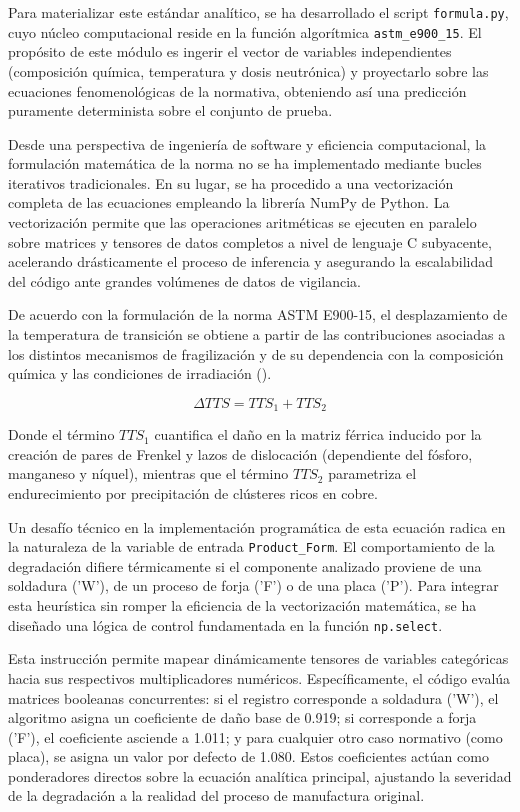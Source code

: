 \documentclass[a4paper, 12pt, twocolumn]{book}
\begin{document}
Para materializar este estándar analítico, se ha desarrollado el script \texttt{formula.py}, cuyo núcleo computacional reside en la función algorítmica \texttt{astm\_e900\_15}. El propósito de este módulo es ingerir el vector de variables independientes (composición química, temperatura y dosis neutrónica) y proyectarlo sobre las ecuaciones fenomenológicas de la normativa, obteniendo así una predicción puramente determinista sobre el conjunto de prueba. 

Desde una perspectiva de ingeniería de software y eficiencia computacional, la formulación matemática de la norma no se ha implementado mediante bucles iterativos tradicionales. En su lugar, se ha procedido a una vectorización completa de las ecuaciones empleando la librería NumPy de Python. La vectorización permite que las operaciones aritméticas se ejecuten en paralelo sobre matrices y tensores de datos completos a nivel de lenguaje C subyacente, acelerando drásticamente el proceso de inferencia y asegurando la escalabilidad del código ante grandes volúmenes de datos de vigilancia.

De acuerdo con la formulación de la norma ASTM E900-15, el desplazamiento de la temperatura de transición se obtiene a partir de las contribuciones asociadas a los distintos mecanismos de fragilización y de su dependencia con la composición química y las condiciones de irradiación (\cite{astmE90015}).

\begin{equation}
    \Delta TTS = TTS_1 + TTS_2
\end{equation}

Donde el término $TTS_1$ cuantifica el daño en la matriz férrica inducido por la creación de pares de Frenkel y lazos de dislocación (dependiente del fósforo, manganeso y níquel), mientras que el término $TTS_2$ parametriza el endurecimiento por precipitación de clústeres ricos en cobre.

Un desafío técnico en la implementación programática de esta ecuación radica en la naturaleza de la variable de entrada \texttt{Product\_Form}. El comportamiento de la degradación difiere térmicamente si el componente analizado proviene de una soldadura ('W'), de un proceso de forja ('F') o de una placa ('P'). Para integrar esta heurística sin romper la eficiencia de la vectorización matemática, se ha diseñado una lógica de control fundamentada en la función \texttt{np.select}. 

Esta instrucción permite mapear dinámicamente tensores de variables categóricas hacia sus respectivos multiplicadores numéricos. Específicamente, el código evalúa matrices booleanas concurrentes: si el registro corresponde a soldadura ('W'), el algoritmo asigna un coeficiente de daño base de 0.919; si corresponde a forja ('F'), el coeficiente asciende a 1.011; y para cualquier otro caso normativo (como placa), se asigna un valor por defecto de 1.080. Estos coeficientes actúan como ponderadores directos sobre la ecuación analítica principal, ajustando la severidad de la degradación a la realidad del proceso de manufactura original.
\end{document}
